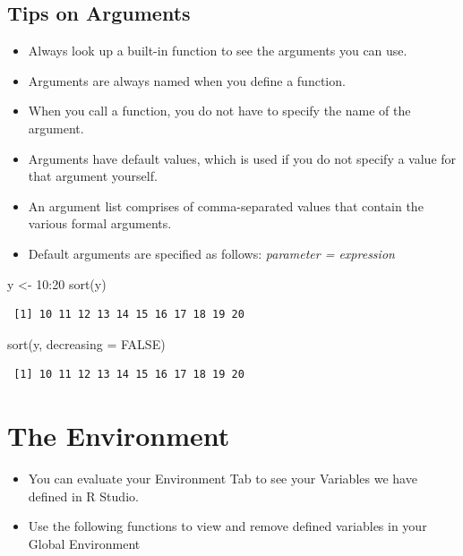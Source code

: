 \documentclass[
  letterpaper,
  DIV=11,
  numbers=noendperiod]{scrreprt}
\newenvironment{Shaded}{\begin{snugshade}}{\end{snugshade}}
\newcommand{\AttributeTok}[1]{\textcolor[rgb]{0.40,0.45,0.13}{#1}}
\newcommand{\ConstantTok}[1]{\textcolor[rgb]{0.56,0.35,0.01}{#1}}
\newcommand{\DecValTok}[1]{\textcolor[rgb]{0.68,0.00,0.00}{#1}}
\newcommand{\FunctionTok}[1]{\textcolor[rgb]{0.28,0.35,0.67}{#1}}
\newcommand{\NormalTok}[1]{\textcolor[rgb]{0.00,0.23,0.31}{#1}}
\newcommand{\OtherTok}[1]{\textcolor[rgb]{0.00,0.23,0.31}{#1}}
\newcommand{\SpecialCharTok}[1]{\textcolor[rgb]{0.37,0.37,0.37}{#1}}
\providecommand{\tightlist}{%
  \setlength{\itemsep}{0pt}\setlength{\parskip}{0pt}}\usepackage{longtable,booktabs,array}
\begin{document}
\subsection{Tips on Arguments}\label{tips-on-arguments}

\begin{itemize}
\tightlist
\item
  Always look up a built-in function to see the arguments you can use.
\item
  Arguments are always named when you define a function.
\item
  When you call a function, you do not have to specify the name of the
  argument.
\item
  Arguments have default values, which is used if you do not specify a
  value for that argument yourself.
\item
  An argument list comprises of comma-separated values that contain the
  various formal arguments.
\item
  Default arguments are specified as follows: \emph{parameter =
  expression}
\end{itemize}

\begin{Shaded}
\begin{Highlighting}[]
\NormalTok{y }\OtherTok{\textless{}{-}} \DecValTok{10}\SpecialCharTok{:}\DecValTok{20}
\FunctionTok{sort}\NormalTok{(y)}
\end{Highlighting}
\end{Shaded}

\begin{verbatim}
 [1] 10 11 12 13 14 15 16 17 18 19 20
\end{verbatim}

\begin{Shaded}
\begin{Highlighting}[]
\FunctionTok{sort}\NormalTok{(y, }\AttributeTok{decreasing =} \ConstantTok{FALSE}\NormalTok{)}
\end{Highlighting}
\end{Shaded}

\begin{verbatim}
 [1] 10 11 12 13 14 15 16 17 18 19 20
\end{verbatim}

\section{The Environment}\label{the-environment}

\begin{itemize}
\tightlist
\item
  You can evaluate your Environment Tab to see your Variables we have
  defined in R Studio.
\item
  Use the following functions to view and remove defined variables in
  your Global Environment
\end{itemize}
\end{document}
